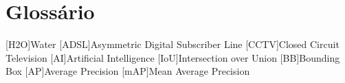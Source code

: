 \chapter{Glossário}

\footnotesize
\SingleSpacing

\begin{multicols}{2}
\begin{acronym}[AAAAAA]

	[H2O]{Water}
	[ADSL]{Asymmetric Digital Subscriber Line}
	[CCTV]{Closed Circuit Television}
	[AI]{Artificial Intelligence}
	[IoU]{Intersection over Union}
	[BB]{Bounding Box}
	[AP]{Average Precision}
	[mAP]{Mean Average Precision}
\end{acronym}
\end{multicols}

